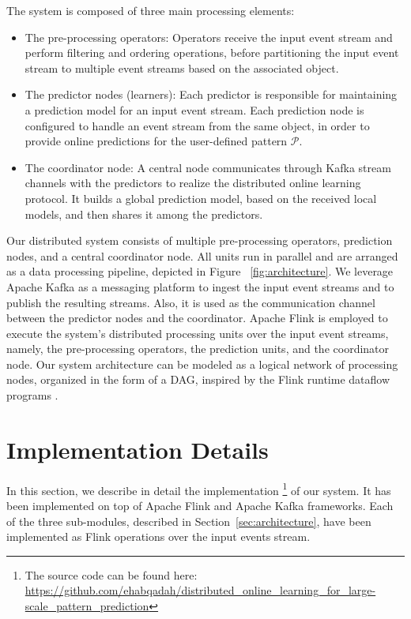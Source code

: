 The system is composed of three main processing elements:   
\begin{itemize}
	
	\item The pre-processing operators: Operators receive the input event stream and perform filtering and ordering operations, before partitioning the input event stream to multiple event streams based on the associated object. 
	\item The predictor nodes (learners): Each predictor is responsible for maintaining a prediction model for an input event stream. Each prediction node is configured to handle an event stream from the same  object, in order to provide online predictions for the user-defined pattern $\mathcal{P}$.  
	\item The coordinator node:  A central node communicates through Kafka stream channels with the predictors to realize the distributed online learning protocol. It builds a global prediction model, based on the received local models, and then shares it among the predictors.
\end{itemize}

\par Our distributed system consists of multiple pre-processing operators, prediction nodes, and a central coordinator node. All units run in parallel and are arranged as a data processing pipeline, depicted in Figure ~\ref{fig:architecture}. We leverage Apache Kafka as a messaging platform to ingest the input event streams and to publish the resulting streams. Also, it is used as the communication channel between the predictor nodes and the coordinator. Apache Flink is employed to execute the system's distributed processing units over the input event streams, namely, the pre-processing operators,  the prediction units, and the coordinator node. Our system architecture can be modeled as a logical network of processing nodes, organized in the form of a DAG, inspired by the Flink runtime dataflow programs \cite{carbone2015apache}. 

\section{Implementation Details}
\label{sec:impl}
In this section, we describe in detail the implementation \footnote{The source code can be found here: \url{https://github.com/ehabqadah/distributed_online_learning_for_large-scale_pattern_prediction}} of our system. It has been implemented on top of Apache Flink and Apache Kafka frameworks. Each of the three sub-modules, described in Section~\ref{sec:architecture}, have been implemented as Flink operations over the input events stream. 

